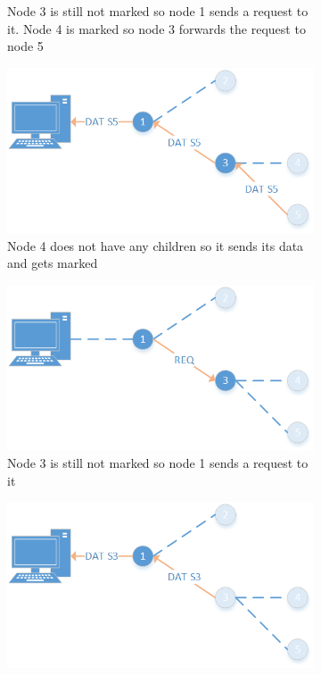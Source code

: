 \begin{figure}[htbp]
\begin{subfigure}[t]{0.4\textwidth}
        \caption{Node 3 is still not marked so node 1 sends a request to it. Node 4 is marked so node 3 forwards the request to node 5}
        \label{fig:coll5}
    \end{subfigure}
    \quad
    \quad
    \begin{subfigure}[t]{0.4\textwidth}
		\centering         
        \includegraphics[scale=0.6]{content/images/Collection/Part6}
        \caption{Node 4 does not have any children so it sends its data and gets marked}
        \label{fig:coll6}
    \end{subfigure}
    \quad
    \quad
    \begin{subfigure}[t]{0.4\textwidth}
		\centering         
        \includegraphics[scale=0.6]{content/images/Collection/Part7}
        \caption{Node 3 is still not marked so node 1 sends a request to it}
        \label{fig:coll7}
    \end{subfigure}
    \quad
    \quad
    \begin{subfigure}[t]{0.4\textwidth}
		\centering         
        \includegraphics[scale=0.6]{content/images/Collection/Part8}

\end{subfigure}
\end{figure}
